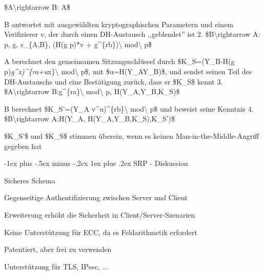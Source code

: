 \documentclass[a4paper]{article}
\makeatletter
\renewcommand{\subsubsection}{\@startsection{subsubsection}{3}{0mm}%
 {-1ex plus -.5ex minus -.2ex}%
 {1ex plus .2ex}%
 {\normalfont\small\bfseries}}
\makeatother
\begin{document}
\begin{multicols}{3}
\begin{itemize*}
            \begin{enumerate*}
                  \def\labelenumi{\arabic{enumi}.}
                  \item \$A\textbackslash rightarrow B: A\$
            \end{enumerate*}
            \item
            B antwortet mit ausgewählten kryptographischen Parametern und einem
            Verifizierer v, der durch einen DH-Austausch ,,geblendet'' ist 2.
            \$B\textbackslash rightarrow A: p, g, s\_\{A,B\}, (H(g
            \textbar\textbar{} p)*v + g\^{}\{rb\})\textbackslash{}
            mod\textbackslash{} p\$
            \item
            A berechnet den gemeinsamen Sitzungsschlüssel durch \$K\_S=(Y\_B-H(g
            \textbar\textbar{} p)\emph{g\^{}x)\^{}\{ra+u}x\}\textbackslash{}
            mod\textbackslash{} p\$, mit \$u=H(Y\_A\textbar\textbar Y\_B)\$, und
            sendet seinen Teil des DH-Austauschs und eine Bestätigung zurück, dass
            er \$K\_S\$ kennt 3. \$A\textbackslash rightarrow
            B:g\^{}\{ra\}\textbackslash{} mod\textbackslash{} p,
            H(Y\_A,Y\_B,K\_S)\$
            \item
            B berechnet \$K\_S'=(Y\_A v\^{}u)\^{}\{rb\}\textbackslash{}
            mod\textbackslash{} p\$ und beweist seine Kenntnis 4.
            \$B\textbackslash rightarrow A:H(Y\_A, H(Y\_A,Y\_B,K\_S),K\_S')\$
            \item
            \$K\_S'\$ und \$K\_S\$ stimmen überein, wenn es keinen
            Man-in-the-Middle-Angriff gegeben hat
      \end{itemize*}


      \subsubsection{SRP - Diskussion}

      \begin{itemize*}
            \item
            Sicheres Schema

            \begin{itemize*}
                  \item Gegenseitige Authentifizierung zwischen Server und Client
                  \item Erweiterung erhöht die Sicherheit in Client/Server-Szenarien
                  \item Keine Unterstützung für ECC, da es Feldarithmetik erfordert
            \end{itemize*}
            \item
            Patentiert, aber frei zu verwenden
            \item
            Unterstützung für TLS, IPsec, ...
      \end{itemize*}



\end{multicols}
\end{document}
